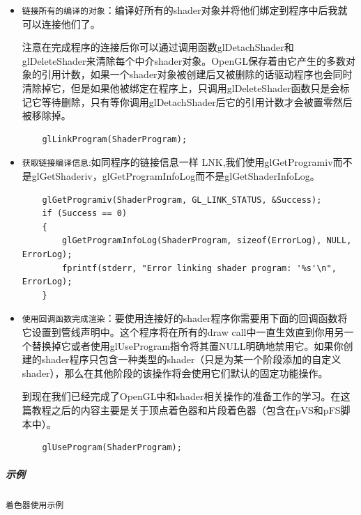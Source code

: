 \documentclass[UTF8,a4paper,12pt]{ctexbook}
\begin{document}
\begin{itemize}
			
			\item \verb|链接所有的编译的对象|：编译好所有的shader对象并将他们绑定到程序中后我就可以连接他们了。
			
			注意在完成程序的连接后你可以通过调用函数glDetachShader和glDeleteShader来清除每个中介shader对象。OpenGL保存着由它产生的多数对象的引用计数，如果一个shader对象被创建后又被删除的话驱动程序也会同时清除掉它，但是如果他被绑定在程序上，只调用glDeleteShader函数只是会标记它等待删除，只有等你调用glDetachShader后它的引用计数才会被置零然后被移除掉。
			\begin{lstlisting}
	glLinkProgram(ShaderProgram); 
			\end{lstlisting}
			
			\item \verb|获取链接编译信息|:如同程序的链接信息一样 LNK,我们使用glGetProgramiv而不是glGetShaderiv，glGetProgramInfoLog而不是glGetShaderInfoLog。
			\begin{lstlisting}
	glGetProgramiv(ShaderProgram, GL_LINK_STATUS, &Success); 
	if (Success == 0) 
	{ 
		glGetProgramInfoLog(ShaderProgram, sizeof(ErrorLog), NULL, ErrorLog); 
		fprintf(stderr, "Error linking shader program: '%s'\n", ErrorLog); 
	} 
			\end{lstlisting}
			
			\item \verb|使用回调函数完成渲染|：要使用连接好的shader程序你需要用下面的回调函数将它设置到管线声明中。这个程序将在所有的draw call中一直生效直到你用另一个替换掉它或者使用glUseProgram指令将其置NULL明确地禁用它。如果你创建的shader程序只包含一种类型的shader（只是为某一个阶段添加的自定义shader），那么在其他阶段的该操作将会使用它们默认的固定功能操作。
			
			到现在我们已经完成了OpenGL中和shader相关操作的准备工作的学习。在这篇教程之后的内容主要是关于顶点着色器和片段着色器（包含在pVS和pFS脚本中）。
			\begin{lstlisting}
	glUseProgram(ShaderProgram); 
			\end{lstlisting}
		\end{itemize}
		
		\subparagraph{示例}\verb|着色器使用示例|
		
\end{document}
